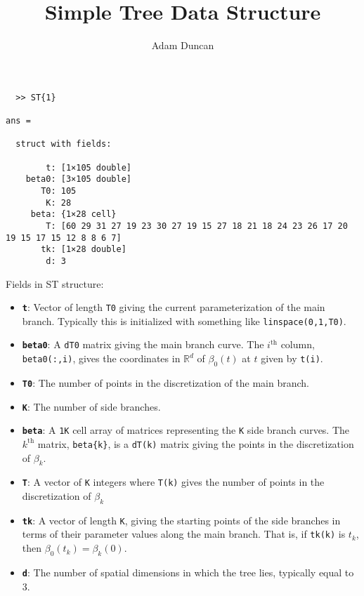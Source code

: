 \documentclass[10pt,a4paper]{article}
\title{Simple Tree Data Structure}
\author{Adam Duncan}
\newcommand{\real}{\mathbb{R}}
\begin{document}
\maketitle



\begin{verbatim}
  >> ST{1}

ans =

  struct with fields:

        t: [1×105 double]
    beta0: [3×105 double]
       T0: 105
        K: 28
     beta: {1×28 cell}
        T: [60 29 31 27 19 23 30 27 19 15 27 18 21 18 24 23 26 17 20 19 15 17 15 12 8 8 6 7]
       tk: [1×28 double]
        d: 3

\end{verbatim}

Fields in ST structure:
\begin{itemize}
  \item {\bf \texttt{t}}:
  Vector of length \texttt{T0} giving the current parameterization of the main branch. Typically this is initialized with something like \texttt{linspace(0,1,T0)}.

  \item {\bf \texttt{beta0}}:
  A \texttt{d\texttimes T0} matrix giving the main branch curve. The $i^\text{th}$ column,  \texttt{beta0(:,i)}, gives the coordinates in $\real^d$ of $\beta_0(t)$ at $t$ given by \texttt{t(i)}.

  \item {\bf \texttt{T0}}:
  The number of points in the discretization of the main branch.

  \item {\bf \texttt{K}}:
  The number of side branches.

  \item {\bf \texttt{beta}}:
  A \texttt{1\texttimes K} cell array of matrices representing the \texttt{K} side branch curves. The $k^\text{th}$ matrix, \texttt{beta\{k\}}, is a \texttt{d\texttimes T(k)} matrix giving the points in the discretization of $\beta_k$.

  \item {\bf \texttt{T}}:
  A vector of \texttt{K} integers where \texttt{T(k)} gives the number of points in the discretization of $\beta_k$

  \item {\bf \texttt{tk}}:
  A vector of length \texttt{K}, giving the starting points of the side branches in terms of their parameter values along the main branch. That is, if \texttt{tk(k)} is $t_k$, then $\beta_0(t_k)=\beta_k(0)$.

  \item {\bf \texttt{d}}:
  The number of spatial dimensions in which the tree lies, typically equal to 3.
\end{itemize}
\end{document}
